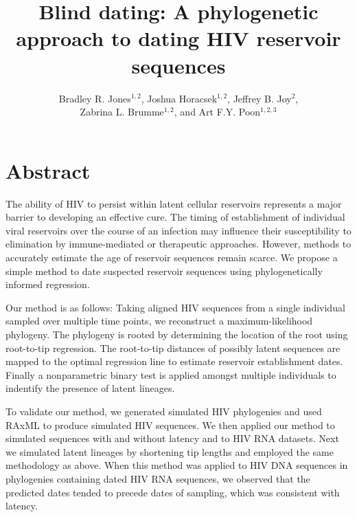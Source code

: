 \documentclass[12pt]{article}
\begin{document}
\title{Blind dating: A phylogenetic approach to dating HIV reservoir sequences}

\author{Bradley R. Jones$^{1,2}$, Joshua Horacsek$^{1,2}$, Jeffrey B. Joy$^2$, \\ Zabrina L. Brumme$^{1,2}$, and Art F.Y. Poon$^{1,2,3}$}
\baselineskip 22pt
\pagewiselinenumbers

\date{}
\maketitle

\section * {Abstract}

The ability of HIV to persist within latent cellular reservoirs represents a major barrier to developing an effective cure.
The timing of establishment of individual viral reservoirs over the course of an infection may influence their susceptibility to elimination by immune-mediated or therapeutic approaches.
However, methods to accurately estimate the age of reservoir sequences remain scarce.
We propose a simple method to date suspected reservoir sequences using phylogenetically informed regression.

Our method is as follows: Taking aligned HIV sequences from a single individual sampled over multiple time points, we reconstruct a maximum-likelihood phylogeny.
The phylogeny is rooted by determining the location of the root using root-to-tip regression.
The root-to-tip distances of possibly latent sequences are mapped to the optimal regression line to estimate reservoir establishment dates.
Finally a nonparametric binary test is applied amongst multiple individuals to indentify the presence of latent lineages.

To validate our method, we generated simulated HIV phylogenies and used RAxML to produce simulated HIV sequences.
We then applied our method to simulated sequences with and without latency and to HIV RNA datasets.
Next we simulated latent lineages by shortening tip lengths and employed the same methodology as above.
When this method was applied to HIV DNA sequences in phylogenies containing dated HIV RNA sequences, we observed that the predicted dates tended to precede dates of sampling, which was consistent with latency.
\end{document}
